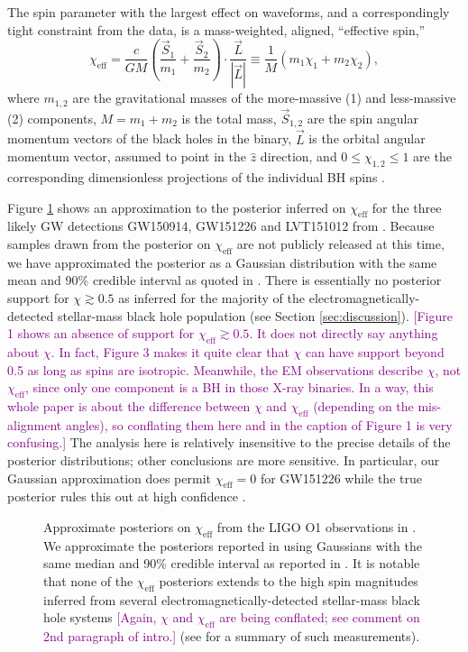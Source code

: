 \documentclass[modern,linenumbers]{aastex61}
\newcommand{\chieff}{\chi_\mathrm{eff}}
\newcommand{\ilya}[1]{\textcolor{purple}{#1}}
\begin{document}
The spin parameter with the largest effect on waveforms, and a
correspondingly tight constraint from the data, is a mass-weighted,
aligned, ``effective spin,''
\begin{equation}
  \chieff = \frac{c}{GM} \left( \frac{\vec{S}_1}{m_1} + \frac{\vec{S}_2}{m_2}
  \right) \cdot \frac{\vec{L}}{\left| \vec{L} \right|} \equiv \frac{1}{M} \left( m_1 \chi_1 + m_2 \chi_2 \right),
\end{equation}
where $m_{1,2}$ are the gravitational masses of the more-massive (1)
and less-massive (2) components, $M = m_1 + m_2$ is the total mass,
$\vec{S}_{1,2}$ are the spin angular momentum vectors of the black
holes in the binary, $\vec{L}$ is the orbital angular momentum vector,
assumed to point in the $\hat{z}$ direction, and
$0 \leq \chi_{1,2} \leq 1$ are the corresponding dimensionless
projections of the individual \ac{BH} spins
\citep{2016PhRvL.116x1102A}.

Figure \ref{fig:O1-posteriors} shows an approximation to the posterior
inferred on $\chieff$ for the three likely \ac{GW} detections
GW150914, GW151226 and LVT151012 from \citet{O1-BBH}.  Because samples
drawn from the posterior on $\chieff$ are not publicly released at
this time, we have approximated the posterior as a Gaussian
distribution with the same mean and 90\% credible interval as quoted
in \citet{O1-BBH}.  There is essentially no posterior support for
$\chi \gtrsim 0.5$ as inferred for the majority of the
electromagnetically-detected stellar-mass black hole population (see
Section \ref{sec:discussion}).  \ilya{[Figure 1 shows an absence of
  support for $\chieff \gtrsim 0.5$.  It does not directly say
  anything about $\chi$.  In fact, Figure 3 makes it quite clear that
  $\chi$ can have support beyond 0.5 as long as spins are isotropic.
  Meanwhile, the EM observations describe $\chi$, not $\chieff$, since
  only one component is a BH in those X-ray binaries.  In a way, this
  whole paper is about the difference between $\chi$ and $\chieff$
  (depending on the mis-alignment angles), so conflating them here and
  in the caption of Figure 1 is very confusing.]}  The analysis here
is relatively insensitive to the precise details of the posterior
distributions; other conclusions are more sensitive.  In particular,
our Gaussian approximation does permit $\chieff = 0$ for GW151226
while the true posterior rules this out at high confidence
\citep{2016PhRvL.116x1103A,O1-BBH}.

\begin{figure}
  \caption{\label{fig:O1-posteriors} Approximate posteriors on
    $\chieff$ from the LIGO O1 observations in \citet{O1-BBH}.  We
    approximate the posteriors reported in \citet{O1-BBH} using
    Gaussians with the same median and 90\% credible interval as
    reported in \citet{O1-BBH}.  It is notable that none of the
    $\chieff$ posteriors extends to the high spin magnitudes inferred
    from several electromagnetically-detected stellar-mass black hole
    systems \ilya{[Again, $\chi$ and $\chieff$ are being conflated; see comment on 2nd paragraph of intro.]} (see \citet{2015PhR...548....1M} for a summary of such
    measurements).}
\end{figure}
\end{document}

